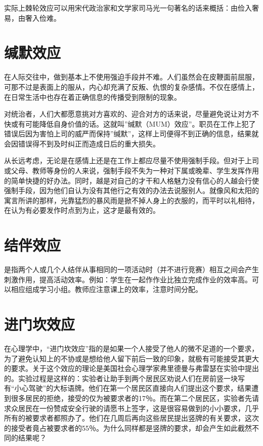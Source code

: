 \documentclass[11pt]{ctexart}
\begin{document}
实际上棘轮效应可以用宋代政治家和文学家司马光一句著名的话来概括：由俭入奢易，由奢入俭难。
\section{缄默效应}
\label{sec-51}


在人际交往中，做到基本上不使用强迫手段并不难。人们虽然会在皮鞭面前屈服，可那不过是表面上的服从，内心却充满了反叛、仇恨的复杂感情。不仅在感情上，在日常生活中也存在着正确信息的传播受到限制的现象。

对统治者，人们大都愿意挑对方喜欢的、迎合对方的话来说，尽量避免说让对方不快或有可能降低自身价值的话。这就叫''缄默（MUM）效应''。职员在工作上犯了错误后因为害怕上司的威严而保持''缄默''，这样上司便得不到正确的信息，结果就会因错误得不到及时纠正而造成日后的重大损失。

从长远考虑，无论是在感情上还是在工作上都应尽量不使用强制手段。但对于上司或父母、教师等身份的人来说，强制手段不失为一种对下属或晚辈、学生发挥作用的简单快捷的好办法。同时，越是对自己的才干和人格魅力没有信心的人越会行使强制手段，因为他们自认为没有其他行之有效的办法去说服别人。就像风和太阳的寓言所讲的那样，光靠猛烈的暴风雨是掀不掉人身上的衣服的，而平时以礼相待，在认为有必要发作时点到为止，这才是最有效的。
\section{结伴效应}
\label{sec-52}


是指两个人或几个人结伴从事相同的一项活动时（并不进行竞赛）相互之间会产生刺激作用，提高活动效率。例如：学生在一起作作业比独立完成作业的效率高。可以相应组成学习小组。教师应注意课上的效率，注意时间分配。
\section{进门坎效应}
\label{sec-53}


在心理学中，“进门坎效应”指的是如果一个人接受了他人的微不足道的一个要求，为了避免认知上的不协或是想给他人留下前后一致的印象，就极有可能接受其更大的要求。关于这个效应的理论是美国社会心理学家弗里德曼与弗雷瑟在实验中提出的。实验过程是这样的：实验者让助手到两个居民区劝说人们在房前竖一块写有“小心驾驶”的大标语牌。他们在第一个居民区直接向人们提出这个要求，结果遭到很多居民的拒绝，接受的仅为被要求者的17％。而在第二个居民区，实验者先请求众居民在一份赞成安全行驶的请愿书上签字，这是很容易做到的小小要求，几乎所有的被要求者都照办了。他们在几周后再向这些居民提出竖牌的有关要求，这次的接受者竟占被要求者的55％。为什么同样都是竖牌的要求，却会产生如此截然不同的结果呢？
\end{document}
